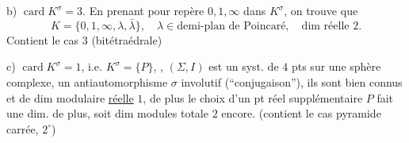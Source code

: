 b) \(\operatorname{card}K^\sigma=3\). En prenant pour repère \(0,1,\infty\) dans \(K^\sigma\), on trouve que
\[
K=\{0,1,\infty,\lambda,\bar\lambda\},\quad
\lambda\in\text{demi-plan de Poincaré},\quad\text{dim réelle }2.
\]
Contient le cas \(3\) (bitétraédrale)

c) \(\operatorname{card}K^\sigma=1\), i.e.  \(K^\sigma=\{P\}\), , 
\((\Sigma,I)\) est un syst. de \(4\) pts sur une sphère complexe,   un antiautomorphisme \(\sigma\) involutif (``conjugaison''), ils sont bien connus et de dim modulaire \uline{réelle} \(1\), de plus le choix d’un pt réel supplémentaire \(P\) fait une dim. de plus, soit dim modules totale \(2\) encore.
(contient le cas pyramide carrée, \(2^\circ\))


